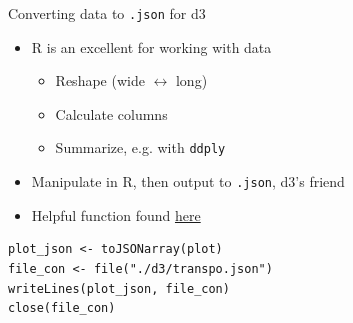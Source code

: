 \documentclass[sans,aspectratio=169,presentation,bigger,fleqn]{beamer}
\begin{document}
\begin{frame}[fragile,label=sec-31]{Converting data to \texttt{.json} for d3}
 \begin{itemize}
\item R is an excellent for working with data
\begin{itemize}
\item Reshape (wide \(\leftrightarrow\) long)
\item Calculate columns
\item Summarize, e.g. with \texttt{ddply}
\end{itemize}
\item Manipulate in R, then output to \texttt{.json}, d3's friend
\item Helpful function found \href{http://theweiluo.wordpress.com/2011/09/30/r-to-json-for-d3-js-and-protovis/}{here}
\end{itemize}

\scriptsize
\begin{verbatim}
plot_json <- toJSONarray(plot)
file_con <- file("./d3/transpo.json")
writeLines(plot_json, file_con)
close(file_con)
\end{verbatim}
\normalsize
\end{frame}
\end{document}
